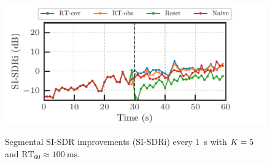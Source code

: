 \documentclass[sip,biber]{now-journal}
\begin{document}
\begin{figure}[t]
\begin{minipage}[t]{\linewidth}
    \centering\includegraphics{figures/plots/online/Gauss_8000_fft4096_990.pdf}\label{fig:plot:gauss:990}
  \end{minipage}
  \caption{Segmental SI-SDR improvements (SI-SDRi) every \SI{1}{\second} with $K = 5$ and $\text{RT}_{60} \approx \SI{100}{\milli\second}$.}%
  \label{fig:plots:sisdr}
\end{figure}
\end{document}
